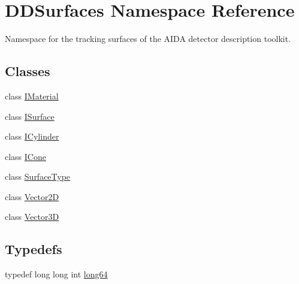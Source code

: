 \hypertarget{namespace_d_d_surfaces}{
\section{DDSurfaces Namespace Reference}
\label{namespace_d_d_surfaces}
}


Namespace for the tracking surfaces of the AIDA detector description toolkit.  
\subsection*{Classes}
\begin{DoxyCompactItemize}
\item 
class \hyperlink{class_d_d_surfaces_1_1_i_material}{IMaterial}
\item 
class \hyperlink{class_d_d_surfaces_1_1_i_surface}{ISurface}
\item 
class \hyperlink{class_d_d_surfaces_1_1_i_cylinder}{ICylinder}
\item 
class \hyperlink{class_d_d_surfaces_1_1_i_cone}{ICone}
\item 
class \hyperlink{class_d_d_surfaces_1_1_surface_type}{SurfaceType}
\item 
class \hyperlink{class_d_d_surfaces_1_1_vector2_d}{Vector2D}
\item 
class \hyperlink{class_d_d_surfaces_1_1_vector3_d}{Vector3D}
\end{DoxyCompactItemize}
\subsection*{Typedefs}
\begin{DoxyCompactItemize}
\item 
typedef long long int \hyperlink{namespace_d_d_surfaces_ab6b3da366f31f80aec56447ac4442e78}{long64}
\end{DoxyCompactItemize}
